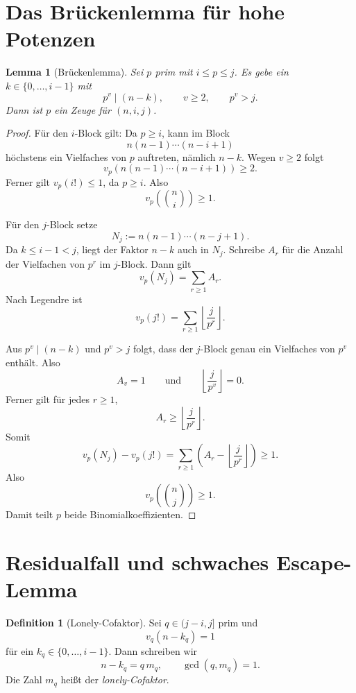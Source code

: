 \documentclass[12pt,a4paper]{article}
\theoremstyle{plain}
\newtheorem{lemma}[theorem]{Lemma}
\theoremstyle{definition}
\newtheorem{definition}[theorem]{Definition}
\theoremstyle{remark}
\begin{document}
	\section{Das Brückenlemma für hohe Potenzen}
	
	\begin{lemma}[Brückenlemma]
		\label{lem:bridge}
		Sei \(p\) prim mit \(i\le p\le j\). Es gebe ein \(k\in\{0,\dots,i-1\}\) mit
		\[
		p^v\mid (n-k),\qquad v\ge2,\qquad p^v>j.
		\]
		Dann ist \(p\) ein Zeuge für \((n,i,j)\).
	\end{lemma}
	
	\begin{proof}
		Für den \(i\)-Block gilt: Da \(p\ge i\), kann im Block
		\[
		n(n-1)\cdots(n-i+1)
		\]
		höchstens ein Vielfaches von \(p\) auftreten, nämlich \(n-k\). Wegen \(v\ge2\) folgt
		\[
		v_p\!\left(n(n-1)\cdots(n-i+1)\right)\ge 2.
		\]
		Ferner gilt \(v_p(i!)\le1\), da \(p\ge i\). Also
		\[
		v_p\!\left(\binom ni\right)\ge1.
		\]
		
		Für den \(j\)-Block setze
		\[
		N_j:=n(n-1)\cdots(n-j+1).
		\]
		Da \(k\le i-1<j\), liegt der Faktor \(n-k\) auch in \(N_j\). Schreibe \(A_r\) für die Anzahl der Vielfachen von \(p^r\) im \(j\)-Block. Dann gilt
		\[
		v_p(N_j)=\sum_{r\ge1} A_r.
		\]
		Nach Legendre ist
		\[
		v_p(j!)=\sum_{r\ge1}\left\lfloor \frac{j}{p^r}\right\rfloor.
		\]
		
		Aus \(p^v\mid(n-k)\) und \(p^v>j\) folgt, dass der \(j\)-Block genau ein Vielfaches von \(p^v\) enthält. Also
		\[
		A_v=1
		\qquad\text{und}\qquad
		\left\lfloor \frac{j}{p^v}\right\rfloor=0.
		\]
		Ferner gilt für jedes \(r\ge1\),
		\[
		A_r\ge \left\lfloor \frac{j}{p^r}\right\rfloor.
		\]
		Somit
		\[
		v_p(N_j)-v_p(j!)
		=
		\sum_{r\ge1}\left(A_r-\left\lfloor \frac{j}{p^r}\right\rfloor\right)\ge1.
		\]
		Also
		\[
		v_p\!\left(\binom nj\right)\ge1.
		\]
		Damit teilt \(p\) beide Binomialkoeffizienten.
	\end{proof}
	
	\section{Residualfall und schwaches Escape-Lemma}
	
	\begin{definition}[Lonely-Cofaktor]
		Sei \(q\in(j-i,j]\) prim und
		\[
		v_q(n-k_q)=1
		\]
		für ein \(k_q\in\{0,\dots,i-1\}\). Dann schreiben wir
		\[
		n-k_q=q\,m_q,\qquad \gcd(q,m_q)=1.
		\]
		Die Zahl \(m_q\) heißt der \emph{lonely-Cofaktor}.
	\end{definition}
	
\end{document}
